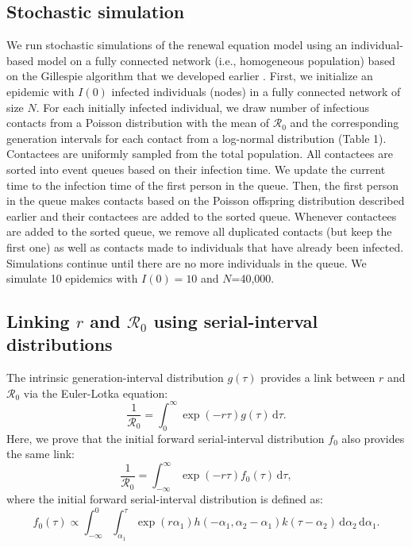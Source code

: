 \documentclass[12pt]{article}
\newcommand{\Rx}[1]{\ensuremath{{\mathcal R}_{#1}}\xspace}
\newcommand{\Ro}{\Rx{0}}
\newcommand{\dd}[1]{\ensuremath{\, \mathrm{d}#1}}
\newcommand{\dtau}{\dd{\tau}}
\newcommand{\gdist}{g} %
\begin{document}
\subsection{Stochastic simulation}

We run stochastic simulations of the renewal equation model using an individual-based model on a fully connected network (i.e., homogeneous population) based on the Gillespie algorithm that we developed earlier \citep{park2019inferring}.
First, we initialize an epidemic with $I(0)$ infected individuals (nodes) in a fully connected network of size $N$. 
For each initially infected individual, we draw number of infectious contacts from a Poisson distribution with the mean of \Ro and the corresponding generation intervals for each contact from a log-normal distribution (Table 1).
Contactees are uniformly sampled from the total population.
All contactees are sorted into event queues based on their infection time.
We update the current time to the infection time of the first person in the queue.
Then, the first person in the queue makes contacts based on the Poisson offspring distribution described earlier and their contactees are added to the sorted queue.
Whenever contactees are added to the sorted queue, we remove all duplicated contacts (but keep the first one) as well as contacts made to individuals that have already been infected.
Simulations continue until there are no more individuals in the queue.
We simulate 10 epidemics with $I(0)=10$ and $N$=40,000.

\subsection{Linking $r$ and \Ro using serial-interval distributions}

The intrinsic generation-interval distribution $\gdist(\tau)$ provides a link between $r$ and \Ro via the Euler-Lotka equation:
\begin{equation}
\frac{1}{\Ro} = \int_0^\infty \exp(-r\tau) \gdist(\tau) \dtau.
\end{equation}
Here, we prove that the initial forward serial-interval distribution $f_0$ also provides the same link:
\begin{equation}
\frac{1}{\Ro} = \int_{-\infty}^\infty \exp(-r\tau) f_{0}(\tau) \dtau,
\end{equation}
where the initial forward serial-interval distribution is defined as:
\begin{equation}
f_{0}(\tau) \propto \int_{-\infty}^{0} \int_{\alpha_1}^{\tau} \exp(r \alpha_1) h(-\alpha_1, \alpha_2 - \alpha_1) k(\tau - \alpha_2) \, \mathrm{d}\alpha_2\,\mathrm{d}\alpha_1.
\end{equation}
\end{document}
